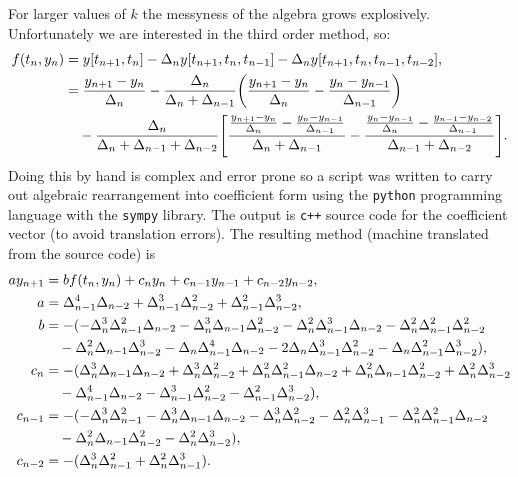 For larger values of $k$ the messyness of the algebra grows explosively.
Unfortunately we are interested in the third order method, so:
\begin{equation}
  \begin{aligned}
    f(t_n, y_n) &= y[t_{n+1}, t_n] - \Delta_{n} y[t_{n+1}, t_n, t_{n-1}] -\Delta_{n} y[t_{n+1}, t_n, t_{n-1}, t_{n-2}], \\
    &=  \frac{y_{n+1} - y_n}{\Delta_{n}} 
    - \frac{\Delta_{n}}{\Delta_{n} + \Delta_{n-1}} {\left(  \frac{y_{n+1} - y_n}{\Delta_{n}} - \frac{y_n - y_{n-1}}{\Delta_{n-1}} \right)} \\
    &\quad - \frac{\Delta_{n}}{\Delta_{n} + \Delta_{n-1} + \Delta_{n-2}}
         {\left[ 
           \frac{\frac{y_{n+1} - y_n}{\Delta_{n}} - \frac{y_n - y_{n-1}}{\Delta_{n-1}}}
                {\Delta_{n} +\Delta_{n-1}}
           -
           \frac{\frac{y_{n} - y_{n-1}}{\Delta_{n}} - \frac{y_{n-1} - y_{n-2}}{\Delta_{n-1}}}
                {\Delta_{n-1} +\Delta_{n-2}}
          \right]}.
  \end{aligned}
\end{equation}
Doing this by hand is complex and error prone so a script was written to carry out algebraic rearrangement into coefficient form using the \texttt{python} programming language with the \texttt{sympy} library\cite{sympy}.
The output is \texttt{c++} source code for the coefficient vector (to avoid translation errors).
The resulting method (machine translated from the source code\cite[src/generic/explicit_timesteppers.cc:EBDF3::set_weights]{oomph-lib-source}) is
\begin{equation}
  \label{eqn:ebdf-coeffs}
  \begin{aligned}
    a y_{n+1} &= b f(t_n, y_n) + c_n y_n + c_{n-1} y_{n-1} + c_{n-2} y_{n-2}, \\
    a &= \Delta_{n-1}^4 \Delta_{n-2}  + \Delta_{n-1}^3 \Delta_{n-2}^2  
    + \Delta_{n-1}^2 \Delta_{n-2}^3 , \\
    b &= -(-\Delta_{n}^3 \Delta_{n-1}^2 \Delta_{n-2}  - \Delta_{n}^3 \Delta_{n-1} \Delta_{n-2}^2  
    - \Delta_{n}^2 \Delta_{n-1}^3 \Delta_{n-2}  
    - \Delta_{n}^2 \Delta_{n-1}^2 \Delta_{n-2}^2  \\
     & \quad - \Delta_{n}^2 \Delta_{n-1} \Delta_{n-2}^3  - \Delta_{n} \Delta_{n-1}^4 \Delta_{n-2}  
     - 2\Delta_{n} \Delta_{n-1}^3 \Delta_{n-2}^2  
     - \Delta_{n} \Delta_{n-1}^2 \Delta_{n-2}^3), \\ 
    c_n &= -(\Delta_{n}^3 \Delta_{n-1} \Delta_{n-2}  + \Delta_{n}^3 \Delta_{n-2}^2  
    + \Delta_{n}^2 \Delta_{n-1}^2 \Delta_{n-2}  
    + \Delta_{n}^2 \Delta_{n-1} \Delta_{n-2}^2  + \Delta_{n}^2 \Delta_{n-2}^3 \\
    &\quad - \Delta_{n-1}^4 \Delta_{n-2}  - \Delta_{n-1}^3 \Delta_{n-2}^2  
    - \Delta_{n-1}^2 \Delta_{n-2}^3 ), \\
    c_{n-1} & = -(-\Delta_{n}^3 \Delta_{n-1}^2  - \Delta_{n}^3 \Delta_{n-1} \Delta_{n-2}  
    - \Delta_{n}^3 \Delta_{n-2}^2  - \Delta_{n}^2 \Delta_{n-1}^3  
    - \Delta_{n}^2 \Delta_{n-1}^2 \Delta_{n-2} \\
    &\quad - \Delta_{n}^2 \Delta_{n-1} \Delta_{n-2}^2  
    - \Delta_{n}^2 \Delta_{n-2}^3 ), \\
    c_{n-2} &= -(\Delta_{n}^3 \Delta_{n-1}^2  + \Delta_{n}^2 \Delta_{n-1}^3 ).
  \end{aligned}
\end{equation}

